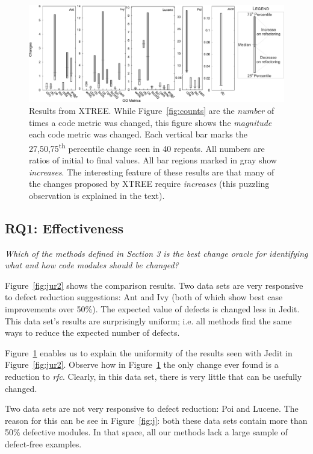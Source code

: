 \documentclass[twocolumn,5p]{elsarticle}
\newcommand{\fig}[1]{Figure~\ref{fig:#1}}
\theoremstyle{break}
\begin{document}
	
	\begin{figure}[!t]
		\centering
		\includegraphics[width=\linewidth]{changes01}
		\caption{Results  from XTREE.
			While \fig{counts} are the {\em number} of times a code metric was 
			changed,
			this  figure shows the {\em magnitude} each code metric was 
			changed. Each vertical bar
			marks the 27,50,75\textsuperscript{th} percentile change seen in 40 
			repeats.
			All numbers are ratios of initial to final values.
			All bar regions marked in gray show {\em increases}.
			The interesting feature of these results are that many
			of the changes proposed by XTREE require {\em increases}
			(this puzzling observation is explained in the text).}
		\label{fig:changes}
	\end{figure}
	
	
	
	\subsection{RQ1: Effectiveness}
	
	{\em Which of the methods defined in Section 3 is the best change oracle 
	for identifying what and how code modules should be changed? }
	
	\fig{jur2} shows the comparison results.
	Two data sets are very responsive to defect reduction suggestions:
	Ant and Ivy (both of which show best case improvements over 50\%).
	The  expected value of defects
	is changed less in Jedit. This data set's results are
	surprisingly uniform; i.e.   all methods
	find the same ways to reduce the expected number of
	defects.
	
	\fig{changes} enables us to explain the uniformity
	of the results seen with Jedit in \fig{jur2}.
	Observe how in \fig{changes} the only change ever
	found is a reduction to {\em rfc}. Clearly, in this
	data set, there is very little that can be usefully changed.
	
	Two data sets are not very responsive to defect reduction:
	Poi and Lucene. The reason for this can be see in \fig{j}:
	both these data sets contain more than 50\% defective modules.
	In that space, all our  methods lack a large sample of
	defect-free examples.
	
\end{document}
